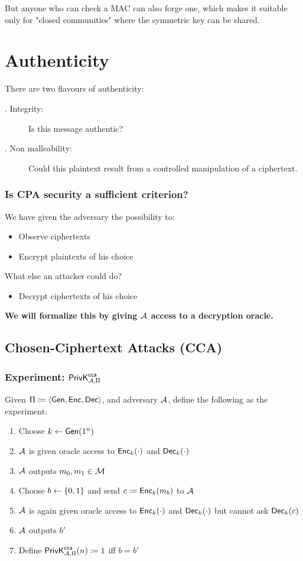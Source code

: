 \documentclass[12pt]{article}
\begin{document}
But anyone who can check a MAC can also forge one, which makes it suitable only for "closed communities" where the symmetric key can be shared.



\section{Authenticity}
There are two flavours of authenticity:
\begin{description}
\item[. Integrity:] Is this message authentic?
\item [. Non malleability:] Could this plaintext result from a controlled manipulation of a ciphertext.
\end{description}
\subsubsection*{Is CPA security a sufficient criterion?}
We have given the adversary the possibility to:
\begin{itemize}
\item Observe ciphertexts
\item Encrypt plaintexts of his choice
\end{itemize}
What else an attacker could do?
\begin{itemize}
\item Decrypt ciphertexts of his choice
\end{itemize}
\textbf{We will formalize this by giving $\mathcal{A}$ access to a decryption oracle.}
\newpage


\subsection{Chosen-Ciphertext Attacks (CCA)}
\subsubsection{Experiment: $\mathsf{PrivK}_{\mathcal{A},\Pi}^\mathsf{cca}$}
Given $\Pi \coloneqq \langle \operatorname{\mathsf{Gen}}, \operatorname{\mathsf{Enc}}, \operatorname{\mathsf{Dec}} \rangle$, and adversary $\mathcal{A}$, define the following as the experiment:
\begin{enumerate}
\item Choose $k \leftarrow \operatorname{\mathsf{Gen}}(1^n)$
\item $\mathcal{A}$ is given oracle access to $\operatorname{\mathsf{Enc}}_k(\cdot)$ and $\operatorname{\mathsf{Dec}}_k(\cdot)$
\item $\mathcal{A}$ outputs $m_0,m_1 \in \mathcal{M}$
\item Choose $b\leftarrow \{0,1\}$ and send $c\coloneqq\operatorname{\mathsf{Enc}}_k(m_b) $ to $\mathcal{A}$
\item $\mathcal{A}$ is again given oracle access to $\operatorname{\mathsf{Enc}}_k(\cdot)$ and $\operatorname{\mathsf{Dec}}_k(\cdot)$ but cannot ask $\operatorname{\mathsf{Dec}}_k(c)$
\item $\mathcal{A}$ outputs $b'$
\item Define $\mathsf{PrivK}_{\mathcal{A},\Pi}^\mathsf{cca}(n)\coloneqq 1$ iff $b=b'$
\end{enumerate}
\end{document}
